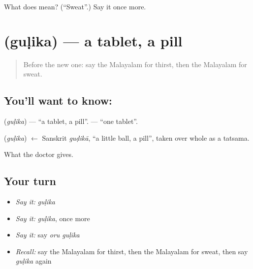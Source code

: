 \begin{tcolorbox}[breakable,colback=teal!4,colframe=teal!35!black,title={Before you move on}]
What does  mean? (\textquotedblleft{}Sweat\textquotedblright{}.) Say it once more.
\end{tcolorbox}
\section[\texorpdfstring{\ml{ഗുളിക} (guḷika)}{ഗുളിക (guḷika)}]{ (guḷika) — a tablet, a pill}

\label{lesson:ML-C117-tablet}



\begin{quote}
Before the new one: say the Malayalam for thirst, then the Malayalam for sweat.
\end{quote}

\subsection*{You'll want to know: }
\textbf{} (\emph{guḷika}) — \textquotedblleft{}a tablet, a pill\textquotedblright{}. \textbf{ } — \textquotedblleft{}one tablet\textquotedblright{}.

\begin{cousinweb}
\textbf{} (\emph{guḷika}) $\leftarrow$ Sanskrit \emph{guḍikā}, \textquotedblleft{}a little ball, a pill\textquotedblright{}, taken over whole as a tatsama.
\end{cousinweb}

\begin{grammarlens}[title={What you've built}]
What the doctor gives.
\end{grammarlens}

\subsection*{Your turn}
\begin{itemize}
\raggedright
  \item \emph{Say it:} \emph{guḷika}
  \item \emph{Say it:} \emph{guḷika}, once more
  \item \emph{Say it:} say \emph{oru guḷika}
  \item \emph{Recall:} say the Malayalam for thirst, then the Malayalam for sweat, then say \emph{guḷika} again
\end{itemize}

